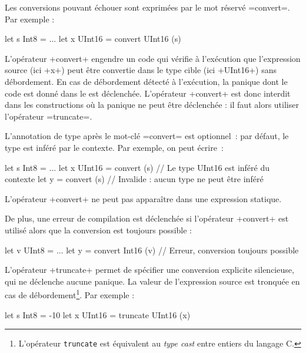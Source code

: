 
Les conversions pouvant échouer sont exprimées par le mot réservé \omnibus=convert=. Par exemple :

\begin{OMNIBUS}
let s Int8 = ...
let x UInt16 = convert UInt16 (s)
\end{OMNIBUS}

L'opérateur \omnibus+convert+ engendre un code qui vérifie à l'exécution que l'expression source (ici \omnibus+x+) peut être convertie dans le type cible (ici \omnibus+UInt16+) sans débordement. En cas de débordement détecté à l'exécution, la panique dont le code est donné dans le  est déclenchée. L'opérateur \omnibus+convert+ est donc interdit dans les constructions où la panique ne peut être déclenchée : il faut alors utiliser l'opérateur \omnibus=truncate=.

L'annotation de type après le mot-clé \omnibus=convert= est optionnel~: par défaut, le type est inféré par le contexte. Par exemple, on peut écrire~:
\begin{OMNIBUS}
let s Int8 = ...
let x UInt16 = convert (s) // Le type UInt16 est inféré du contexte
let y = convert (s) // Invalide : aucun type ne peut être inféré
\end{OMNIBUS}

L'opérateur \omnibus+convert+ ne peut pas apparaître dans une expression statique.

De plus, une erreur de compilation est déclenchée si l'opérateur \omnibus+convert+ est utilisé alors que la conversion est toujours possible :
\begin{OMNIBUS}
let v UInt8 = ...
let y = convert Int16 (v) // Erreur, conversion toujours possible
\end{OMNIBUS}


L'opérateur \omnibus+truncate+ permet de spécifier une conversion explicite silencieuse, qui ne déclenche aucune panique. La valeur de l'expression source est tronquée en cas de débordement\footnote{L'opérateur \texttt{truncate} est équivalent au \emph{type cast} entre entiers du langage C.}. Par exemple :

\begin{OMNIBUS}
let s Int8 = -10
let x UInt16 = truncate UInt16 (x)
\end{OMNIBUS}

